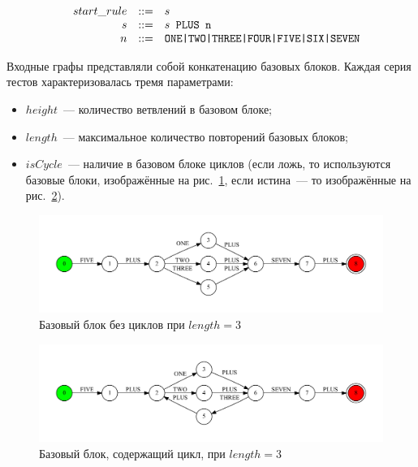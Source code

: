 $$
\begin{array}{crcl}
& start\_rule &::=& s \\
& s & ::= & s \mbox{\texttt{ PLUS }} \mbox{\texttt{n}}\\
& n & ::= & \mbox{\texttt{ONE|TWO|THREE|FOUR|FIVE|SIX|SEVEN}}
\end{array}
$$

Входные графы представляли собой конкатенацию базовых блоков. Каждая серия тестов характеризовалась тремя параметрами: 
\begin{itemize}
  \item $height$~--- количество ветвлений в базовом блоке;
  \item $length$~--- максимальное количество повторений базовых блоков;
  \item $isCycle$~--- наличие в базовом блоке циклов (если ложь, то используются базовые блоки, изображённые на рис.~\ref{block}, если истина~--- то изображённые на рис.~\ref{block_loop}).
\end{itemize}

\begin{figure}[h!]
 \centering
 \includegraphics[width=\textwidth]{Verbitskaya/pics/block.pdf}
 \caption{Базовый блок без циклов при $length=3$}
 \label{block}
\end{figure}

\begin{figure}[h!]
 \centering
 \includegraphics[width=\textwidth]{Verbitskaya/pics/block_loop.pdf}
 \caption{Базовый блок, содержащий цикл, при $length=3$}
 \label{block_loop}
\end{figure}

